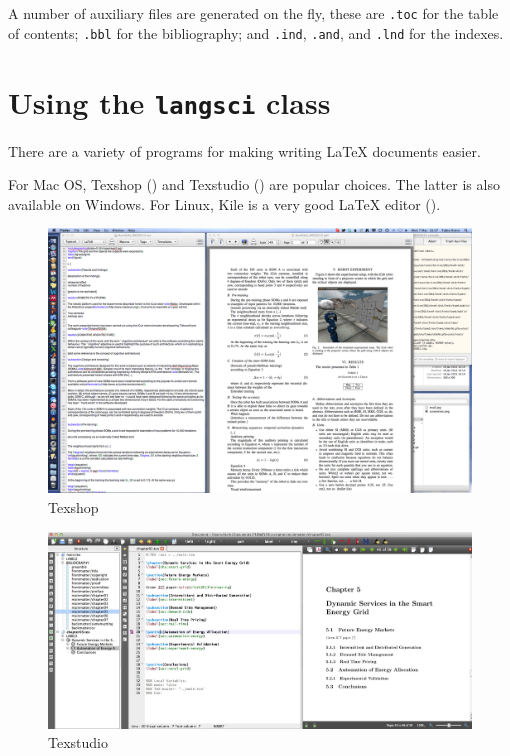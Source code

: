A number of auxiliary files are generated on the fly, these are  \verb+.toc+ for the table of contents; \verb+.bbl+ for the bibliography; and \verb+.ind+, \verb+.and+, and \verb+.lnd+ for the indexes.  

\section{Using the \texttt{langsci} class}
There are a variety of programs for making writing \LaTeX\xspace documents easier.

For Mac OS, Texshop () and Texstudio () are popular choices. The latter is also available on Windows.
For Linux, Kile is a very good \LaTeX\xspace editor ().



\begin{figure}
\includegraphics[height=.4\textheight]{texshop.png}
\caption{Texshop}
\label{fig:latex:texshop} 
\end{figure}

\begin{figure}
\includegraphics[width=\textwidth]{texstudio.jpg}
\caption{Texstudio}
\label{fig:latex:texstudio} 
\end{figure}


